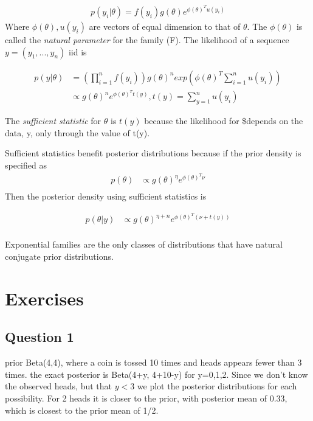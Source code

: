 \documentclass[
]{book}
\theoremstyle{definition}
\theoremstyle{definition}
\theoremstyle{definition}
\theoremstyle{definition}
\theoremstyle{remark}
\begin{document}
\[
\begin{aligned}
 p(y_i | \theta)=f(y_i)g(\theta)e^{\phi(\theta)^Tu(y_i)}
\end{aligned}
\]
Where \(\phi(\theta), u(y_i)\) are vectors of equal dimension to that of \(\theta\). The \(\phi(\theta)\) is called the \emph{natural parameter} for the family (F). The likelihood of a sequence \(y=(y_1,...,y_n)\) iid is

\[
\begin{aligned}
 p(y | \theta)&= (\prod_{i=1}^n f(y_i)) g(\theta)^n exp(\phi(\theta)^T \sum_{i=1}^n u(y_i)) \\
  &\propto g(\theta)^ne^{\phi(\theta)^Tt(y)}, t(y)=\sum_{y=1}^n u(y_i)
\end{aligned}
\]

The \emph{sufficient statistic} for \(\theta\) is \(t(y)\) because the likelihood for \$\theta depends on the data, y, only through the value of t(y).

Sufficient statistics benefit posterior distributions because if the prior density is specified as
\[
\begin{aligned}
 p(\theta)&\propto g(\theta)^{\eta} e^{\phi(\theta)^T \nu} \\
 \end{aligned}
\]
Then the posterior density using sufficient statistics is

\[
\begin{aligned}
 p(\theta | y ) &\propto g(\theta)^{\eta+n} e^{\phi(\theta)^T (\nu+t(y))} \\
 \end{aligned}
\]

Exponential families are the only classes of distributions that have natural conjugate prior distributions.

\hypertarget{exercises-1}{%
\section{Exercises}\label{exercises-1}}

\hypertarget{question-1}{%
\subsection*{Question 1}\label{question-1}}

prior Beta(4,4), where a coin is tossed 10 times and heads appears fewer than 3 times. the exact posterior is Beta(4+y, 4+10-y) for y=0,1,2. Since we don't know the observed heads, but that \(y<3\) we plot the posterior distributions for each possibility. For 2 heads it is closer to the prior, with posterior mean of 0.33, which is closest to the prior mean of 1/2.
\end{document}
